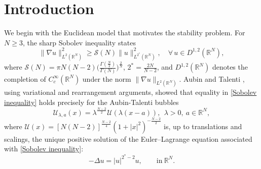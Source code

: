 \documentclass[11pt]{article}
\begin{document}
\begin{abstract}
\smallskip
\emph{\bf Keywords:} Heisenberg group; nonlocal Sobolev inequality; quantitative stability; strict upper bounds; existence of minimizers.

\emph{\bf 2020 Mathematics Subject Classification:} 35B35; 35P30; 35A23; 45E10.

\end{abstract}



\tableofcontents

\section{Introduction}

{We begin with the Euclidean model that motivates the stability problem. For $N\geq3$, the sharp Sobolev inequality states}
\begin{equation}\label{Sobolev inequality}
\|\nabla u\|_{L^{2}(\mathbb{R}^{N})}^{2} \geq \mathcal{S}(N)\|u\|_{L^{2^{\ast}}(\mathbb{R}^{N})}^{2},\quad \forall \, u\in{D}^{1,2}(\mathbb{R}^{N}),
 \end{equation}
where ${\mathcal{S}(N)}=\pi N(N-2)\Big(\frac{\Gamma(\frac{N}{2})}{\Gamma(N)}\Big)^{\frac{2}{N}}$, $2^{\ast}=\frac{2N}{N-2}$, and $D^{1,2}(\mathbb{R}^N)$ denotes the completion of $C_c^\infty(\mathbb{R}^{N})$ under the norm $\|\nabla u\|_{L^{2}(\mathbb{R}^{N})}$.
{Aubin \cite{A76} and Talenti \cite{T76}, using variational and rearrangement arguments, showed that equality in \eqref{Sobolev inequality} holds precisely for the Aubin-Talenti bubbles}
\begin{equation*}
\mathcal{U}_{\lambda,a}(x)=\lambda^{\frac{N-2}{2}}\mathcal{U}(\lambda(x-a)),~~\lambda>0,~a\in\mathbb{R}^{N},
\end{equation*}
{where $\mathcal{U}(x)= [N(N-2)]^{\frac{N-2}{4}}(1+|x|^{2})^{-\frac{N-2}{2}}$ is, up to translations and scalings, the unique positive solution of the Euler--Lagrange equation associated with \eqref{Sobolev inequality}:}
\begin{equation*}
 -\Delta u=|u|^{2^{\ast}-2}u,\qquad \mathrm{in}~\mathbb{R}^{N}.
\end{equation*}
\end{document}
